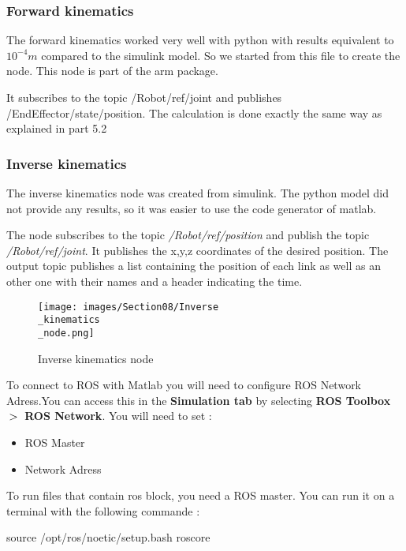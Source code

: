 \subsubsection{Forward kinematics}

The forward kinematics worked very well with python with results equivalent to $10^{-4}m$ compared to the simulink model. So we started from this file to create the node. This node is part of the arm package. 

\bigbreak
It subscribes to the topic /Robot/ref/joint and publishes /EndEffector/state/position. The calculation is done exactly the same way as explained in part 5.2

\subsubsection{Inverse kinematics}

The inverse kinematics node was created from simulink. The python model did not provide any results, so it was easier to use the code generator of matlab.

\bigbreak
The node subscribes to the topic \textit{/Robot/ref/position} and publish the topic \textit{/Robot/ref/joint}. It publishes the x,y,z coordinates of the desired position. The output topic publishes a list containing the position of each link as well as an other one with their names and a header indicating the time.
\bigbreak
\begin{figure}[ht]
    \centering
    \texttt{[image: images/Section08/Inverse\\\_kinematics\\\_node.png]}
    \caption{Inverse kinematics node}
    \label{fig:mesh21}
\end{figure}
\FloatBarrier

\bigbreak
To connect to ROS with Matlab you will need to configure ROS Network Adress.You can access this in the \textbf{Simulation tab} by selecting \textbf{ROS Toolbox} $\bg$ \textbf{ROS Network}. You will need to set :
\begin{multicols}{2}
    \begin{itemize}[noitemsep]
        \item ROS Master
        \item Network Adress
    \end{itemize}
\end{multicols}

\bigbreak
To run files that contain ros block, you need a ROS master. You can run it on a terminal with the following commande :
\begin{commandshell}
    source /opt/ros/noetic/setup.bash
    roscore
\end{commandshell} 

